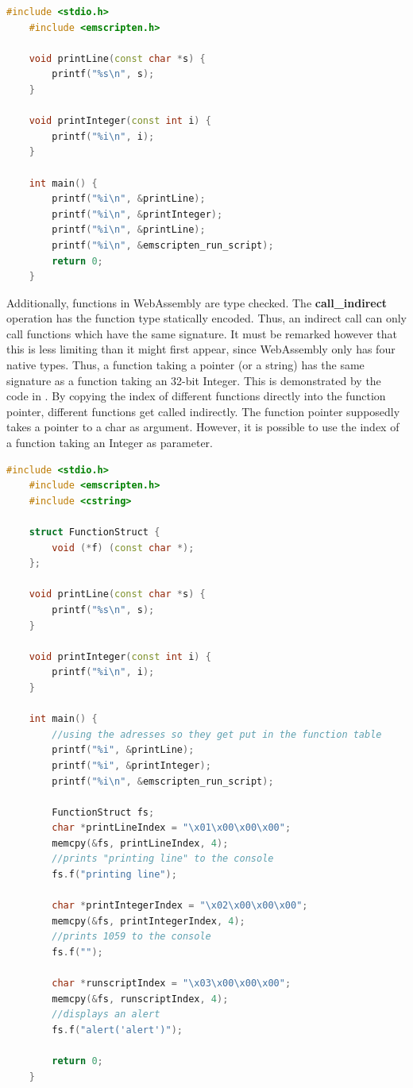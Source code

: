 \documentclass[sigconf]{acmart}
\begin{document}
\begin{lstlisting}[language=C++, caption={This Code demonstrates how WebAssembly handles function pointers. This code prints 1,2,1,3 to the console when running it in the browser.}, label={fig:wasm_function_addr}]
	#include <stdio.h>
	#include <emscripten.h>

	void printLine(const char *s) {
		printf("%s\n", s);
	}

	void printInteger(const int i) {
		printf("%i\n", i);
	}

	int main() {
		printf("%i\n", &printLine);
		printf("%i\n", &printInteger);
		printf("%i\n", &printLine);
		printf("%i\n", &emscripten_run_script);
		return 0;
	}
\end{lstlisting}

Additionally, functions in WebAssembly are type checked. The \textbf{call\_indirect} operation has the function type statically encoded. Thus, an indirect call can only call functions which have the same signature. It must be remarked however that this is less limiting than it might first appear, since WebAssembly only has four native types. Thus, a function taking a pointer (or a string) has the same signature as a function taking an 32-bit Integer. This is demonstrated by the code in . By copying the index of different functions directly into the function pointer, different functions get called indirectly. The function pointer supposedly takes a pointer to a char as argument. However, it is possible to use the index of a function taking an Integer as parameter. 

\begin{lstlisting}[language=C++, caption={Example demonstrating how function pointer type checking works.}, label={fig:wasm_function_type_checking}]
	#include <stdio.h>
	#include <emscripten.h>
	#include <cstring>

	struct FunctionStruct {
		void (*f) (const char *);
	};

	void printLine(const char *s) {
		printf("%s\n", s);
	}

	void printInteger(const int i) {
		printf("%i\n", i);
	}

	int main() {	
		//using the adresses so they get put in the function table
		printf("%i", &printLine);
		printf("%i", &printInteger);
		printf("%i\n", &emscripten_run_script);
		
		FunctionStruct fs;
		char *printLineIndex = "\x01\x00\x00\x00";
		memcpy(&fs, printLineIndex, 4);
		//prints "printing line" to the console
		fs.f("printing line"); 
		
		char *printIntegerIndex = "\x02\x00\x00\x00";
		memcpy(&fs, printIntegerIndex, 4);
		//prints 1059 to the console
		fs.f("");
		
		char *runscriptIndex = "\x03\x00\x00\x00";
		memcpy(&fs, runscriptIndex, 4);
		//displays an alert
		fs.f("alert('alert')");		
		
		return 0;
	}
\end{lstlisting}
\end{document}
